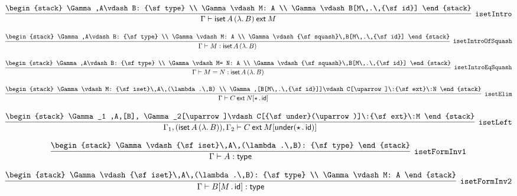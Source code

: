 \[
\infer[{\tt isetIntro}]{\Gamma \vdash {\sf iset}\,A\,(\lambda .\,B)\:{\sf ext}\:M}{
\begin{stack}
\Gamma ,A\vdash B: {\sf type}
\\
\Gamma \vdash M: A
\\
\Gamma \vdash B[M\,.\,{\sf id}]
\end{stack}}
\]

\[
\infer[{\tt isetIntroOfSquash}]{\Gamma \vdash M: {\sf iset}\,A\,(\lambda .\,B)}{
\begin{stack}
\Gamma ,A\vdash B: {\sf type}
\\
\Gamma \vdash M: A
\\
\Gamma \vdash {\sf squash}\,B[M\,.\,{\sf id}]
\end{stack}}
\]

\[
\infer[{\tt isetIntroEqSquash}]{\Gamma \vdash M= N: {\sf iset}\,A\,(\lambda .\,B)}{
\begin{stack}
\Gamma ,A\vdash B: {\sf type}
\\
\Gamma \vdash M= N: A
\\
\Gamma \vdash {\sf squash}\,B[M\,.\,{\sf id}]
\end{stack}}
\]

\[
\infer[{\tt isetElim}]{\Gamma \vdash C\:{\sf ext}\:N[\star \,.\,{\sf id}]}{
\begin{stack}
\Gamma \vdash M: {\sf iset}\,A\,(\lambda .\,B)
\\
\Gamma ,[B[M\,.\,{\sf id}]]\vdash C[\uparrow ]\:{\sf ext}\:N
\end{stack}}
\]

\[
\infer[{\tt isetLeft}]{\Gamma_1 ,({\sf iset}\,A\,(\lambda .\,B)), \Gamma_2 \vdash C\:{\sf ext}\:M[{\sf under}(\star \,.\,{\sf id})]}{
\begin{stack}
\Gamma_1 ,A,[B], \Gamma_2[\uparrow ]\vdash C[{\sf under}(\uparrow )]\:{\sf ext}\:M
\end{stack}}
\]

\[
\infer[{\tt isetFormInv1}]{\Gamma \vdash A: {\sf type}}{
\begin{stack}
\Gamma \vdash {\sf iset}\,A\,(\lambda .\,B): {\sf type}
\end{stack}}
\]

\[
\infer[{\tt isetFormInv2}]{\Gamma \vdash B[M\,.\,{\sf id}]: {\sf type}}{
\begin{stack}
\Gamma \vdash {\sf iset}\,A\,(\lambda .\,B): {\sf type}
\\
\Gamma \vdash M: A
\end{stack}}
\]

